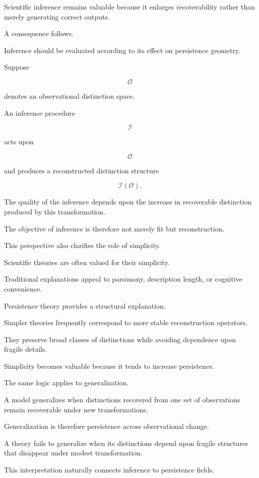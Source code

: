 \documentclass[12pt,oneside]{article}
\theoremstyle{definition}
\begin{document}
Scientific inference remains valuable because it enlarges recoverability rather than merely generating correct outputs.

A consequence follows.

Inference should be evaluated according to its effect on persistence geometry.

Suppose

\[
\mathcal O
\]

denotes an observational distinction space.

An inference procedure

\[
\mathcal I
\]

acts upon

\[
\mathcal O
\]

and produces a reconstructed distinction structure

\[
\mathcal I(\mathcal O).
\]

The quality of the inference depends upon the increase in recoverable distinction produced by this transformation.

The objective of inference is therefore not merely fit but reconstruction.

This perspective also clarifies the role of simplicity.

Scientific theories are often valued for their simplicity.

Traditional explanations appeal to parsimony, description length, or cognitive convenience.

Persistence theory provides a structural explanation.

Simpler theories frequently correspond to more stable reconstruction operators.

They preserve broad classes of distinctions while avoiding dependence upon fragile details.

Simplicity becomes valuable because it tends to increase persistence.

The same logic applies to generalization.

A model generalizes when distinctions recovered from one set of observations remain recoverable under new transformations.

Generalization is therefore persistence across observational change.

A theory fails to generalize when its distinctions depend upon fragile structures that disappear under modest transformation.

This interpretation naturally connects inference to persistence fields.
\end{document}
